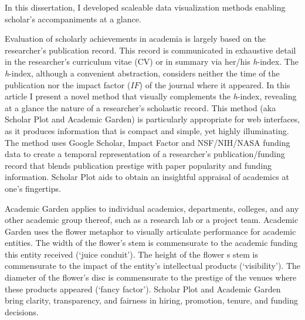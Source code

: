 In this dissertation, I developed scaleable data visualization methods enabling scholar's accompaniments at a glance.


Evaluation of scholarly achievements in academia is largely based on the researcher's publication record. This record is communicated in exhaustive detail in the researcher's curriculum vitae (CV) or in summary via her/his {\it h}-index. The {\it h}-index, although a convenient abstraction, considers neither the time of the publication nor the impact factor ($IF$) of the journal where it appeared. In this article I present a novel method that visually complements the {\it h}-index, revealing at a glance the nature of a researcher's scholastic record. This method (aka Scholar Plot and Academic Garden) is particularly appropriate for web interfaces, as it produces information that is compact and simple, yet highly illuminating. The method uses Google Scholar, Impact Factor and NSF/NIH/NASA funding data to create a temporal representation of a researcher's publication/funding record that blends publication prestige with paper popularity and funding information. Scholar Plot aids to obtain an insightful appraisal of academics at one's fingertips.


Academic Garden applies to individual academics, departments, colleges, and any other academic group thereof, such as a research lab or a project team. Academic Garden uses the flower metaphor to visually articulate performance for academic entities. The width of the flower's stem is commensurate to the academic funding this entity received (`juice conduit'). The height of the flower
s stem is commensurate to the impact of the entity's intellectual products (`visibility'). The diameter of the flower's disc is commensurate to the prestige of the venues where these products appeared (`fancy factor'). Scholar Plot and Academic Garden bring clarity, transparency, and fairness in hiring, promotion, tenure, and funding decisions.



